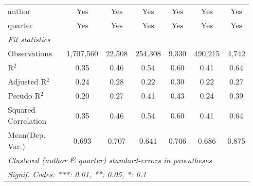 \begin{tabular}{lcccccc}
   author                                                     & Yes            & Yes           & Yes           & Yes           & Yes            & Yes\\  
   quarter                                                    & Yes            & Yes           & Yes           & Yes           & Yes            & Yes\\  
   \midrule
   \emph{Fit statistics}\\
   Observations                                               & 1,707,560      & 22,508        & 254,308       & 9,330         & 490,215        & 4,742\\  
   R$^2$                                                      & 0.35           & 0.46          & 0.54          & 0.60          & 0.41           & 0.64\\  
   Adjusted R$^2$                                             & 0.24           & 0.28          & 0.22          & 0.30          & 0.22           & 0.27\\  
   Pseudo R$^2$                                               & 0.20           & 0.27          & 0.41          & 0.43          & 0.24           & 0.39\\  
   Squared Correlation                                        & 0.35           & 0.46          & 0.54          & 0.60          & 0.41           & 0.64\\  
Mean(Dep. Var.) & 0.693 & 0.707 & 0.641 & 0.706 & 0.686 & 0.875 \\
   \midrule \midrule
   \multicolumn{7}{l}{\emph{Clustered (author \& quarter) standard-errors in parentheses}}\\
   \multicolumn{7}{l}{\emph{Signif. Codes: ***: 0.01, **: 0.05, *: 0.1}}\\
\end{tabular}
\par\endgroup

